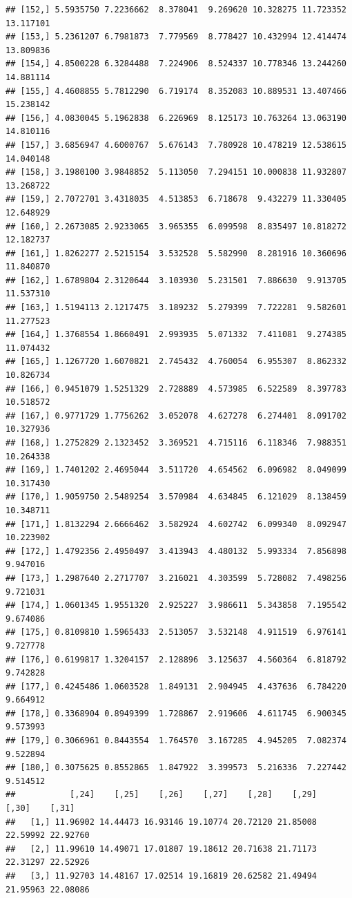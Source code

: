 \documentclass{article}\usepackage[]{graphicx}\usepackage[]{color}
\makeatletter
\newenvironment{kframe}{%
 \def\at@end@of@kframe{}%
 \ifinner\ifhmode%
  \def\at@end@of@kframe{\end{minipage}}%
  \begin{minipage}{\columnwidth}%
 \fi\fi%
 \def\FrameCommand##1{\hskip\@totalleftmargin \hskip-\fboxsep
 \colorbox{shadecolor}{##1}\hskip-\fboxsep
     \hskip-\linewidth \hskip-\@totalleftmargin \hskip\columnwidth}%
 \MakeFramed {\advance\hsize-\width
   \@totalleftmargin\z@ \linewidth\hsize
   \@setminipage}}%
 {\par\unskip\endMakeFramed%
 \at@end@of@kframe}
\newenvironment{knitrout}{}{} %
\makeatother
\begin{document}
\begin{knitrout}
\begin{kframe}
\begin{verbatim}
## [152,] 5.5935750 7.2236662  8.378041  9.269620 10.328275 11.723352 13.117101
## [153,] 5.2361207 6.7981873  7.779569  8.778427 10.432994 12.414474 13.809836
## [154,] 4.8500228 6.3284488  7.224906  8.524337 10.778346 13.244260 14.881114
## [155,] 4.4608855 5.7812290  6.719174  8.352083 10.889531 13.407466 15.238142
## [156,] 4.0830045 5.1962838  6.226969  8.125173 10.763264 13.063190 14.810116
## [157,] 3.6856947 4.6000767  5.676143  7.780928 10.478219 12.538615 14.040148
## [158,] 3.1980100 3.9848852  5.113050  7.294151 10.000838 11.932807 13.268722
## [159,] 2.7072701 3.4318035  4.513853  6.718678  9.432279 11.330405 12.648929
## [160,] 2.2673085 2.9233065  3.965355  6.099598  8.835497 10.818272 12.182737
## [161,] 1.8262277 2.5215154  3.532528  5.582990  8.281916 10.360696 11.840870
## [162,] 1.6789804 2.3120644  3.103930  5.231501  7.886630  9.913705 11.537310
## [163,] 1.5194113 2.1217475  3.189232  5.279399  7.722281  9.582601 11.277523
## [164,] 1.3768554 1.8660491  2.993935  5.071332  7.411081  9.274385 11.074432
## [165,] 1.1267720 1.6070821  2.745432  4.760054  6.955307  8.862332 10.826734
## [166,] 0.9451079 1.5251329  2.728889  4.573985  6.522589  8.397783 10.518572
## [167,] 0.9771729 1.7756262  3.052078  4.627278  6.274401  8.091702 10.327936
## [168,] 1.2752829 2.1323452  3.369521  4.715116  6.118346  7.988351 10.264338
## [169,] 1.7401202 2.4695044  3.511720  4.654562  6.096982  8.049099 10.317430
## [170,] 1.9059750 2.5489254  3.570984  4.634845  6.121029  8.138459 10.348711
## [171,] 1.8132294 2.6666462  3.582924  4.602742  6.099340  8.092947 10.223902
## [172,] 1.4792356 2.4950497  3.413943  4.480132  5.993334  7.856898  9.947016
## [173,] 1.2987640 2.2717707  3.216021  4.303599  5.728082  7.498256  9.721031
## [174,] 1.0601345 1.9551320  2.925227  3.986611  5.343858  7.195542  9.674086
## [175,] 0.8109810 1.5965433  2.513057  3.532148  4.911519  6.976141  9.727778
## [176,] 0.6199817 1.3204157  2.128896  3.125637  4.560364  6.818792  9.742828
## [177,] 0.4245486 1.0603528  1.849131  2.904945  4.437636  6.784220  9.664912
## [178,] 0.3368904 0.8949399  1.728867  2.919606  4.611745  6.900345  9.573993
## [179,] 0.3066961 0.8443554  1.764570  3.167285  4.945205  7.082374  9.522894
## [180,] 0.3075625 0.8552865  1.847922  3.399573  5.216336  7.227442  9.514512
##           [,24]    [,25]    [,26]    [,27]    [,28]    [,29]    [,30]    [,31]
##   [1,] 11.96902 14.44473 16.93146 19.10774 20.72120 21.85008 22.59992 22.92760
##   [2,] 11.99610 14.49071 17.01807 19.18612 20.71638 21.71173 22.31297 22.52926
##   [3,] 11.92703 14.48167 17.02514 19.16819 20.62582 21.49494 21.95963 22.08086

\end{verbatim}
\end{kframe}
\end{knitrout}
\end{document}
